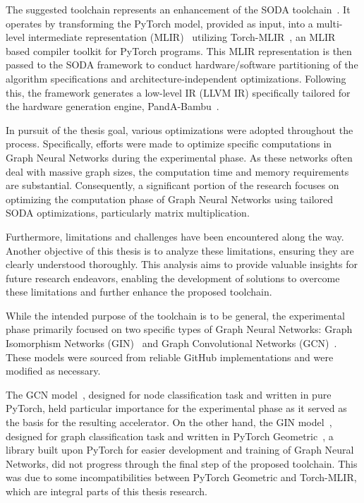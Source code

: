 \documentclass{Configuration_Files/PoliMi3i_thesis}
\begin{document}
    The suggested toolchain represents an enhancement of the SODA toolchain~\cite{9786533}.
    It operates by transforming the PyTorch model, provided as input, into a multi-level intermediate representation
    (MLIR)~\cite{9370308} utilizing Torch-MLIR~\cite{torch_mlir}, an MLIR based compiler toolkit for PyTorch programs.
    This MLIR representation is then passed to the SODA framework to conduct hardware/software partitioning of the algorithm
    specifications and architecture-independent optimizations.
    Following this, the framework generates a low-level IR (LLVM IR) specifically tailored for the hardware generation engine,
    PandA-Bambu~\cite{9586110}.

    In pursuit of the thesis goal, various optimizations were adopted throughout the process.
    Specifically, efforts were made to optimize specific computations in Graph Neural Networks during the experimental phase.
    As these networks often deal with massive graph sizes, the computation time and memory requirements are substantial.
    Consequently, a significant portion of the research focuses on optimizing the computation phase of Graph Neural Networks using
    tailored SODA optimizations, particularly matrix multiplication.

    Furthermore, limitations and challenges have been encountered along the way.
    Another objective of this thesis is to analyze these limitations, ensuring they are clearly understood thoroughly.
    This analysis aims to provide valuable insights for future research endeavors, enabling the development of solutions
    to overcome these limitations and further enhance the proposed toolchain.

    While the intended purpose of the toolchain is to be general, the experimental phase primarily focused on two specific
    types of Graph Neural Networks: Graph Isomorphism Networks (GIN)~\cite{xu2019powerful} and Graph Convolutional Networks (GCN)~\cite{DBLP:journals/corr/KipfW16}.
    These models were sourced from reliable GitHub implementations and were modified as necessary.

    The GCN model~\cite{pygcn}, designed for node classification task and written in pure PyTorch, held particular importance for the
    experimental phase as it served as the basis for the resulting accelerator.
    On the other hand, the GIN model~\cite{ogb_gnn_models}, designed for graph classification task and written in PyTorch Geometric~\cite{DBLP:journals/corr/abs-1903-02428},
    a library built upon PyTorch for easier development and training of Graph Neural Networks, did not progress through
    the final step of the proposed toolchain.
    This was due to some incompatibilities between PyTorch Geometric and Torch-MLIR, which are integral parts of this thesis research.
    
\end{document}

